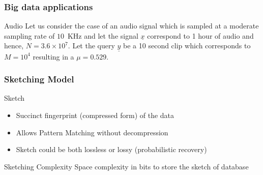 \documentclass[10pt,xcolor=table]{beamer}
\newcommand{\xv}{\underline{x}}
\newcommand{\yv}{\underline{y}}
\begin{document}
\begin{frame}\frametitle{Big data applications}
\begin{block}{Audio}
Let us consider the case of an audio signal which is sampled at a moderate sampling rate of $10$~KHz and let the signal $\xv$ correspond to 1 hour of audio and hence, $N = 3.6 \times 10^7$. Let the query $\yv$ be a 10 second clip which corresponds to $M = 10^4$ resulting in a $\mu = 0.529$.
\end{block}
\begin{block}{}
\begin{figure}
\end{figure}
\end{block}
\end{frame}

\begin{frame} \frametitle{Sketching Model}
	\begin{block}{Sketch}
		\begin{itemize}
			\item Succinct fingerprint (compressed form) of the data 
			\item Allows Pattern Matching without decompression 
			\item Sketch could be both lossless or lossy (probabilistic recovery)
		\end{itemize}
	\end{block}
	\begin{block}{Sketching Complexity}
		Space complexity in bits to store the sketch of database
	\end{block}
\end{frame}
\end{document}
